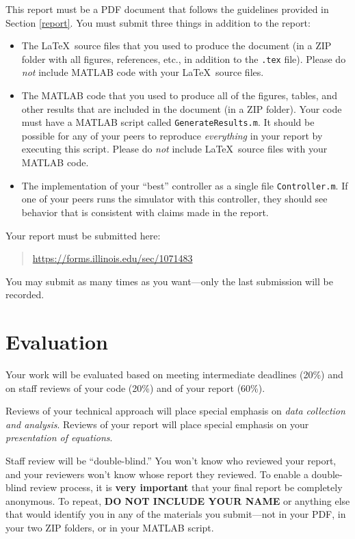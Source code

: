 \documentclass[conf]{new-aiaa}
\begin{document}
This report must be a PDF document that follows the guidelines provided in Section \ref{report}. You must submit three things in addition to the report:
\begin{itemize}
\item The \LaTeX\ source files that you used to produce the document (in a ZIP folder with all figures, references, etc., in addition to the \lstinline|.tex| file). Please do {\em not} include MATLAB code with your \LaTeX\ source files.
\item The MATLAB code that you used to produce all of the figures, tables, and other results that are included in the document (in a ZIP folder). Your code must have a MATLAB script called \lstinline|GenerateResults.m|. It should be possible for any of your peers to reproduce {\em everything} in your report by executing this script. Please do {\em not} include \LaTeX\ source files with your MATLAB code.
\item The implementation of your ``best'' controller as a single file \lstinline|Controller.m|. If one of your peers runs the simulator with this controller, they should see behavior that is consistent with claims made in the report.
\end{itemize}
Your report must be submitted here:
\begin{quote}
\url{https://forms.illinois.edu/sec/1071483}
\end{quote}
You may submit as many times as you want---only the last submission will be recorded.


\section{Evaluation}

Your work will be evaluated based on meeting intermediate deadlines (20\%) and on staff reviews of your code (20\%) and of your report (60\%).

Reviews of your technical approach will place special emphasis on {\em data collection and analysis}. Reviews of your report will place special emphasis on your {\em presentation of equations}.

Staff review will be ``double-blind.'' You won't know who reviewed your report, and your reviewers won't know whose report they reviewed. To enable a double-blind review process, it is \textbf{very important} that your final report be completely anonymous. To repeat, \textbf{DO NOT INCLUDE YOUR NAME} or anything else that would identify you in any of the materials you submit---not in your PDF, in your two ZIP folders, or in your MATLAB script.
\end{document}
